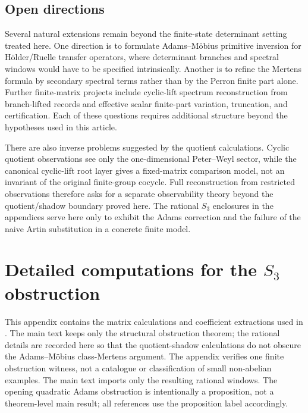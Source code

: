 \documentclass[11pt,a4paper]{amsart}
\theoremstyle{plain}
\theoremstyle{definition}
\theoremstyle{remark}
\begin{document}
\subsection{Open directions}

Several natural extensions remain beyond the finite-state determinant setting
treated here.  One direction is to formulate Adams--M\"obius primitive inversion
for H\"older/Ruelle transfer operators, where determinant branches and spectral
windows would have to be specified intrinsically.  Another is to refine the
Mertens formula by secondary spectral terms rather than by the Perron finite
part alone.  Further finite-matrix projects include cyclic-lift spectrum
reconstruction from branch-lifted records and effective scalar finite-part
variation, truncation, and certification.  Each of these questions requires
additional structure beyond the hypotheses used in this article.

There are also inverse problems suggested by the quotient calculations.  Cyclic
quotient observations see only the one-dimensional Peter--Weyl sector, while the
canonical cyclic-lift root layer gives a fixed-matrix comparison model, not an
invariant of the original finite-group cocycle.  Full reconstruction from
restricted observations therefore asks for a separate observability theory
beyond the quotient/shadow boundary proved here.  The rational
\(S_3\) enclosures in the appendices serve
here only to exhibit the Adams correction and the failure of the naive Artin
substitution in a concrete finite model.

\appendix
\section[Detailed computations for the S3 obstruction]{Detailed computations for the \texorpdfstring{$S_3$}{S3} obstruction}
\label{app:s3-model-computations}

This appendix contains the matrix calculations and coefficient extractions
used in . The main text keeps only the structural
obstruction theorem; the rational details are recorded here so that the
quotient-shadow calculations do not obscure the Adams--M\"obius class-Mertens
argument.  The appendix verifies one finite obstruction witness, not a
catalogue or classification of small non-abelian examples.  The main text
imports only the resulting rational windows.
The opening quadratic Adams obstruction is intentionally a proposition,
not a theorem-level main result; all references use the proposition label
accordingly.
\end{document}
